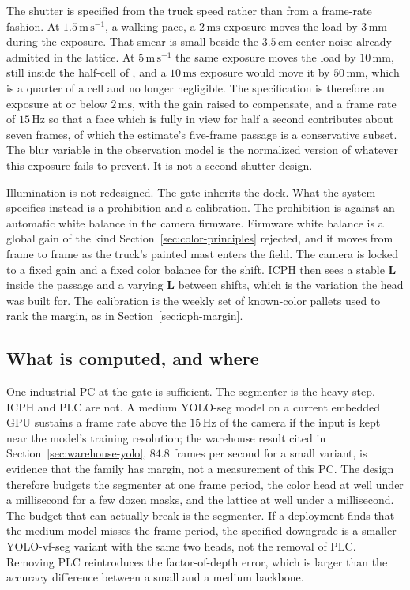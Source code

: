The shutter is specified from the truck speed rather than from a frame-rate fashion. At $1.5\,\mathrm{m\,s^{-1}}$, a walking pace, a $2\,\mathrm{ms}$ exposure moves the load by $3\,\mathrm{mm}$ during the exposure. That smear is small beside the $3.5\,\mathrm{cm}$ center noise already admitted in the lattice. At $5\,\mathrm{m\,s^{-1}}$ the same exposure moves the load by $10\,\mathrm{mm}$, still inside the half-cell of , and a $10\,\mathrm{ms}$ exposure would move it by $50\,\mathrm{mm}$, which is a quarter of a cell and no longer negligible. The specification is therefore an exposure at or below $2\,\mathrm{ms}$, with the gain raised to compensate, and a frame rate of $15\,\mathrm{Hz}$ so that a face which is fully in view for half a second contributes about seven frames, of which the estimate's five-frame passage is a conservative subset. The blur variable in the observation model is the normalized version of whatever this exposure fails to prevent. It is not a second shutter design.

Illumination is not redesigned. The gate inherits the dock. What the system specifies instead is a prohibition and a calibration. The prohibition is against an automatic white balance in the camera firmware. Firmware white balance is a global gain of the kind Section~\ref{sec:color-principles} rejected, and it moves from frame to frame as the truck's painted mast enters the field. The camera is locked to a fixed gain and a fixed color balance for the shift. ICPH then sees a stable $\mathbf{L}$ inside the passage and a varying $\mathbf{L}$ between shifts, which is the variation the head was built for. The calibration is the weekly set of known-color pallets used to rank the margin, as in Section~\ref{sec:icph-margin}.

\subsection{What is computed, and where}
\label{sec:compute}

One industrial PC at the gate is sufficient. The segmenter is the heavy step. ICPH and PLC are not. A medium YOLO-seg model on a current embedded GPU sustains a frame rate above the $15\,\mathrm{Hz}$ of the camera if the input is kept near the model's training resolution; the warehouse result cited in Section~\ref{sec:warehouse-yolo}, $84.8$ frames per second for a small variant, is evidence that the family has margin, not a measurement of this PC. The design therefore budgets the segmenter at one frame period, the color head at well under a millisecond for a few dozen masks, and the lattice at well under a millisecond. The budget that can actually break is the segmenter. If a deployment finds that the medium model misses the frame period, the specified downgrade is a smaller YOLO-vf-seg variant with the same two heads, not the removal of PLC. Removing PLC reintroduces the factor-of-depth error, which is larger than the accuracy difference between a small and a medium backbone.

